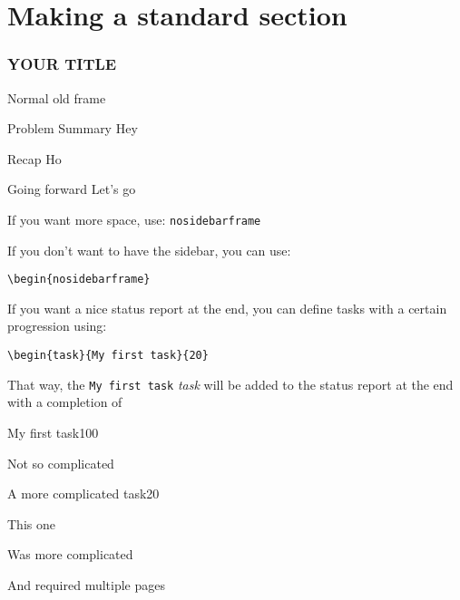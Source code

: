 \section{Making a standard section} 

\begin{frame}\frametitle{YOUR TITLE}
Normal old frame		
\end{frame}

\begin{frame}	
	\begin{block}{Problem Summary}
	Hey
	\end{block}
	
	
	\begin{exampleblock}{Recap}
	Ho
	\end{exampleblock}
	
	\begin{alertblock}{Going forward}
	Let's go
	\end{alertblock}

\end{frame}


\begin{nosidebarframe}
\centering
 If you want more space, use: \texttt{nosidebarframe}
\end{nosidebarframe}






\begin{frame}[containsverbatim]

If you don't want to have the sidebar, you can use:

\verb|\begin{nosidebarframe}|

If you want a nice status report at the end, you can define tasks with a certain progression using:

\verb|\begin{task}{My first task}{20}|

That way, the \texttt{My first task} \textit{task} will be added to the status report at the end with a completion of 

\end{frame}


\begin{task}{My first task}{100}

Not so complicated 

\end{task}

\begin{task}{A more complicated task}{20}

This one

\pagebreak

Was more complicated 

\pagebreak

And required multiple pages
\end{task}




